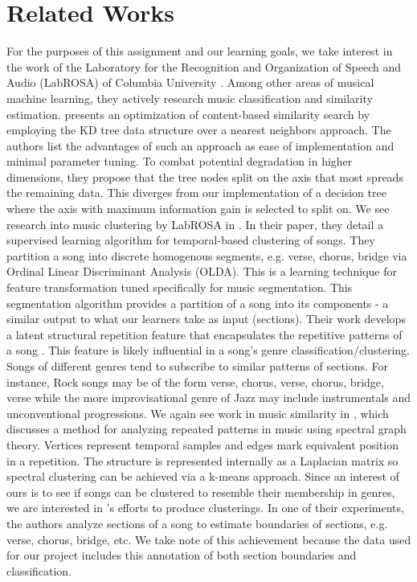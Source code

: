\documentclass[11pt, twocolumn]{article}
\begin{document}
\section{Related Works}
    For the purposes of this assignment and our learning goals, we take interest in the work of the Laboratory for the Recognition and Organization of Speech and Audio (LabROSA) of Columbia University \cite{labrosa}. Among other areas of musical machine learning, they actively research music classification and similarity estimation. \cite{similarity} presents an optimization of content-based similarity search by employing the KD tree data structure over a nearest neighbors approach. The authors list the advantages of such an approach as ease of implementation and minimal parameter tuning. To combat potential degradation in higher dimensions, they propose that the tree nodes split on the axis that most spreads the remaining data. This diverges from our implementation of a decision tree where the axis with maximum information gain is selected to split on.
    We see research into music clustering by LabROSA in \cite{olda}. In their paper, they detail a supervised learning algorithm for temporal-based clustering of songs. They partition a song into discrete homogenous segments, e.g. verse, chorus, bridge via Ordinal Linear Discriminant Analysis (OLDA). This is a learning technique for feature transformation tuned specifically for music segmentation. This segmentation algorithm provides a partition of a song into its components - a similar output to what our learners take as input (sections). Their work develops a latent structural repetition feature that encapsulates the repetitive patterns of a song \cite{olda}. This feature is likely influential in a song’s genre classification/clustering. Songs of different genres tend to subscribe to similar patterns of sections. For instance, Rock songs may be of the form verse, chorus, verse, chorus, bridge, verse while the more improvisational genre of Jazz may include instrumentals and unconventional progressions.
    We again see work in music similarity in \cite{structure}, which discusses a method for analyzing repeated patterns in music using spectral graph theory. Vertices represent temporal samples and edges mark equivalent position in a repetition. The structure is represented internally as a Laplacian matrix so spectral clustering can be achieved via a k-means approach. Since an interest of ours is to see if songs can be clustered to resemble their membership in genres, we are interested in \cite{structure}’s efforts to produce clusterings. In one of their experiments, the authors analyze sections of a song to estimate boundaries of sections, e.g. verse, chorus, bridge, etc. We take note of this achievement because the data used for our project includes this annotation of both section boundaries and classification.
\end{document}
